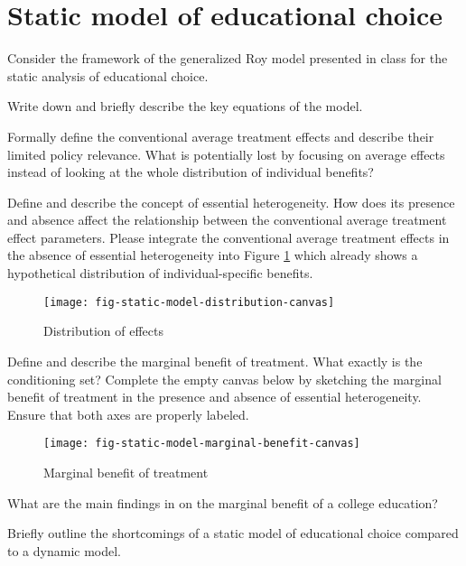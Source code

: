 \FloatBarrier\section{Static model of educational choice}
Consider the framework of the generalized Roy model presented in class for the static analysis of educational choice.

\begin{boenumerate}

\item Write down and briefly describe the key equations of the model.

\item Formally define the conventional average treatment effects and describe their limited policy relevance. What is potentially lost by focusing on average effects instead of looking at the whole distribution of individual benefits?

\item Define and describe the concept of essential heterogeneity. How does its presence and absence affect the relationship between the conventional average treatment effect parameters. Please integrate the conventional average treatment effects in the absence of essential heterogeneity into Figure \ref{Distribution of effects} which already shows a hypothetical distribution of individual-specific benefits.

\begin{figure}[htp]\centering
\caption{Distribution of effects}\label{Distribution of effects}\scalebox{0.35}
{\texttt{[image: fig-static-model-distribution-canvas]}}
\end{figure}

\item Define and describe the marginal benefit of treatment. What exactly is the conditioning set? Complete the empty canvas below by sketching the marginal benefit of treatment in the presence and absence of essential heterogeneity. Ensure that both axes are properly labeled.

\begin{figure}[htp]\centering
\caption{Marginal benefit of treatment}\scalebox{0.35}
{\texttt{[image: fig-static-model-marginal-benefit-canvas]}}
\end{figure}

\item What are the main findings in \cite{Carneiro.2011} on the marginal benefit of a college education?

\item Briefly outline the shortcomings of a static model of educational choice compared to a dynamic model.
\end{boenumerate}

